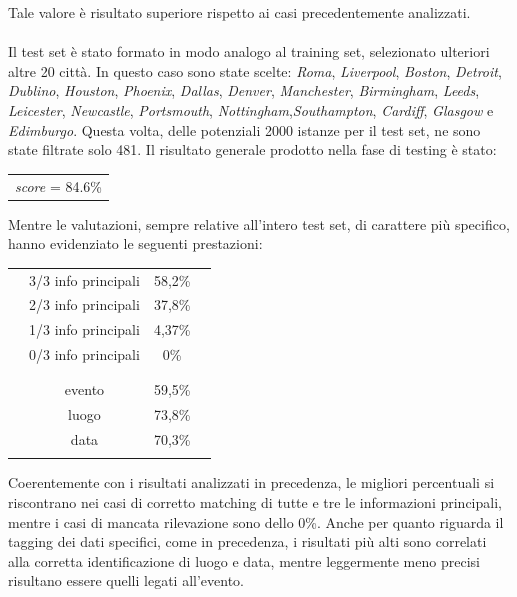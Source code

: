 \documentclass[a4paper]{report}
\begin{document}
Tale valore è risultato superiore rispetto ai casi precedentemente analizzati. \\ \\
Il test set è stato formato in modo analogo al training set, selezionato ulteriori altre 20 città. In questo caso sono state scelte: \textit{Roma}, \textit{Liverpool}, \textit{Boston}, \textit{Detroit}, \textit{Dublino}, \textit{Houston}, \textit{Phoenix}, \textit{Dallas}, \textit{Denver}, \textit{Manchester}, \textit{Birmingham}, \textit{Leeds}, \textit{Leicester}, \textit{Newcastle}, \textit{Portsmouth}, \textit{Nottingham},\textit{Southampton}, \textit{Cardiff}, \textit{Glasgow} e \textit{Edimburgo}. Questa volta, delle potenziali 2000 istanze per il test set, ne sono state filtrate solo 481.  Il risultato generale prodotto nella fase di testing è stato: 
\begin{center}
\begin{tabular}{c}
\textit{score} = 84.6\%\\
\end{tabular}
\end{center}
Mentre le valutazioni, sempre relative all'intero test set, di carattere più specifico, hanno evidenziato le seguenti prestazioni:
\begin{center}
\begin{tabular}{cccc}
& & & \\
\hline
& 3/3 info principali & 58,2\% &\\
& 2/3 info principali & 37,8\% &\\ 
& 1/3 info principali & 4,37\% &\\ 
& 0/3 info principali & 0\% &\\ 
\hline
& & & \\
& & & \\
\hline
& evento & 59,5\% &\\
& luogo & 73,8\% &\\
& data & 70,3\% &\\
\hline
& & & \\
\end{tabular}
\end{center}
Coerentemente con i risultati analizzati in precedenza, le migliori percentuali si riscontrano nei casi di corretto matching di tutte e tre le informazioni principali, mentre i casi di mancata rilevazione sono dello 0\%. Anche per quanto riguarda il tagging dei dati specifici, come in precedenza, i risultati più alti sono correlati alla corretta identificazione di luogo e data, mentre leggermente meno precisi risultano essere quelli legati all'evento.
\end{document}
